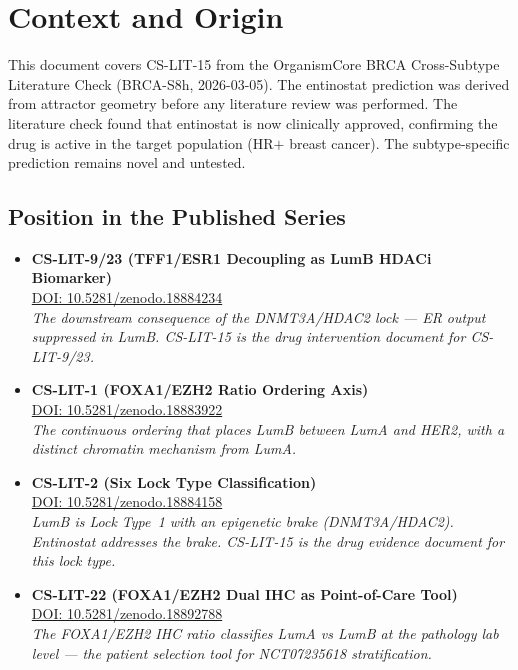 \documentclass[12pt, a4paper]{article}
\begin{document}
\section{Context and Origin}

This document covers CS-LIT-15 from the
OrganismCore BRCA Cross-Subtype Literature Check
(BRCA-S8h, 2026-03-05). The entinostat
prediction was derived from attractor geometry
before any literature review was performed.
The literature check found that entinostat is
now clinically approved, confirming the drug is
active in the target population (HR$+$ breast
cancer). The subtype-specific prediction remains
novel and untested.

\subsection{Position in the Published Series}

\begin{itemize}
    \item \textbf{CS-LIT-9/23 (TFF1/ESR1
    Decoupling as LumB HDACi Biomarker)}\\
    \href{https://doi.org/10.5281/zenodo.18884234}
    {DOI: 10.5281/zenodo.18884234}\\
    \textit{The downstream consequence of the
    DNMT3A/HDAC2 lock --- ER output suppressed
    in LumB. CS-LIT-15 is the drug intervention
    document for CS-LIT-9/23.}

    \item \textbf{CS-LIT-1 (FOXA1/EZH2 Ratio
    Ordering Axis)}\\
    \href{https://doi.org/10.5281/zenodo.18883922}
    {DOI: 10.5281/zenodo.18883922}\\
    \textit{The continuous ordering that places
    LumB between LumA and HER2, with a distinct
    chromatin mechanism from LumA.}

    \item \textbf{CS-LIT-2 (Six Lock Type
    Classification)}\\
    \href{https://doi.org/10.5281/zenodo.18884158}
    {DOI: 10.5281/zenodo.18884158}\\
    \textit{LumB is Lock Type~1 with an epigenetic
    brake (DNMT3A/HDAC2). Entinostat addresses
    the brake. CS-LIT-15 is the drug evidence
    document for this lock type.}

    \item \textbf{CS-LIT-22 (FOXA1/EZH2 Dual
    IHC as Point-of-Care Tool)}\\
    \href{https://doi.org/10.5281/zenodo.18892788}
    {DOI: 10.5281/zenodo.18892788}\\
    \textit{The FOXA1/EZH2 IHC ratio classifies
    LumA vs LumB at the pathology lab level ---
    the patient selection tool for NCT07235618
    stratification.}
\end{itemize}
\end{document}
